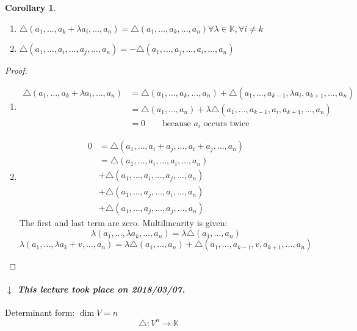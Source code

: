 \documentclass{article}
\newtheorem{corollary}{Corollary}  \numberwithin{corollary}{section}
\newcommand{\dateref}[1]{%
  \begin{mdframed}[backgroundcolor=gray!10,innerbottommargin=0pt,innertopmargin=0pt]
    \paragraph{\textit{$\downarrow$ This lecture took place on #1.}}%
  \end{mdframed}%
}
\begin{document}
\begin{corollary} %
  \begin{enumerate}
    \item[4.]
      $\triangle(a_1, \dots, a_k + \lambda a_i, \dots, a_n) = \triangle(a_1, \dots, a_k, \dots, a_n) \forall \lambda \in \mathbb K, \forall i \neq k$
    \item[5.]
      $\triangle(a_1, \dots, a_i, \dots, a_j, \dots, a_n) = -\triangle(a_1, \dots, a_j, \dots, a_i, \dots, a_n)$
  \end{enumerate}
\end{corollary}
\begin{proof}
  \begin{enumerate}
    \item
      \begin{align*}
        \triangle(a_1, \dots, a_k + \lambda a_i, \dots, a_n)
          &= \triangle (a_1, \dots, a_k, \dots, a_n) + \triangle (a_1, \dots, a_{k-1}, \lambda a_i, a_{k+1}, \dots, a_n) \\
          &= \triangle (a_1, \dots, a_n) + \lambda \triangle (a_1, \dots, a_{k-1}, a_i, a_{k+1}, \dots, a_n) \\
          &= 0 \qquad \text{because $a_i$ occurs twice}
      \end{align*}
    \item
      \begin{align*}
        0 &= \triangle(a_1, \dots, a_i + a_j, \dots, a_i + a_j, \dots, a_n) \\
          &= \triangle(a_1, \dots, a_i, \dots, a_i, \dots, a_n) \\
          &+ \triangle(a_1, \dots, a_i, \dots, a_j, \dots, a_n) \\
          &+ \triangle(a_1, \dots, a_j, \dots, a_i, \dots, a_n) \\
          &+ \triangle(a_1, \dots, a_j, \dots, a_j, \dots, a_n)
      \end{align*}
      The first and last term are zero. Multilinearity is given:
      \[ \lambda(a_1, \dots, \lambda a_k, \dots, a_n) = \lambda \triangle (a_1, \dots, a_n) \]
      \[ \lambda(a_1, \dots, \lambda a_k + v, \dots, a_n) = \lambda \triangle (a_1, \dots, a_n) + \triangle (a_1, \dots, a_{k-1}, v, a_{k+1}, \dots, a_n) \]
  \end{enumerate}
\end{proof}

\dateref{2018/03/07}

Determinant form: $\dim{V} = n$
\[ \triangle: V^n \to \mathbb K \]
\end{document}
